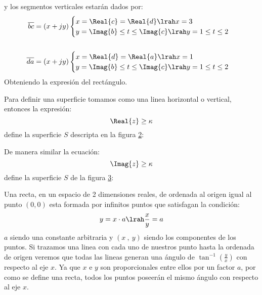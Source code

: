 y los segmentos verticales estarán dados por:
\begin{equation}
\begin{aligned}
    \overline{bc}=(x+jy)&
    \begin{cases}
        x=\Real{c}=\Real{d}\lrah x=3\\
        y=\Imag{b}\leq t\leq \Imag{c}\lrah y=1\leq t\leq2
    \end{cases}\\
    \\
    \overline{da}=(x+jy)&
    \begin{cases}
        x=\Real{d}=\Real{a}\lrah x=1\\
        y=\Imag{b}\leq t\leq \Imag{c}\lrah y=1\leq t\leq2
    \end{cases}
\end{aligned}
\end{equation}
Obteniendo la expresión del rectángulo.
\begin{figure}[H]
    \centering
    
    \label{fig:RectF}
\end{figure}
Para definir una superficie tomamos como una linea horizontal o vertical, entonces la expresión:
\begin{equation}
    \Real{z} \geq \kappa
\end{equation}
define la superficie $S$ descripta en la figura \ref{fig:SupVF}:
\begin{figure}[H]
    \centering
    
    \label{fig:SupVF}
\end{figure}
De manera similar la ecuación:
\begin{equation}
    \Imag{z} \geq \kappa
\end{equation}
define la superficie $S$ de la figura \ref{fig:SupHF}:
\begin{figure}[H]
    \centering
    
    \label{fig:SupHF}
\end{figure}
Una recta, en un espacio de 2 dimensiones reales, de ordenada al origen igual al punto $(0,0)$ esta formada por infinitos puntos que satisfagan la condición:
\begin{equation}
   y=x\cdot a \lrah \frac{x}{y}=a
\end{equation}
$a$ siendo una constante arbitraria y $(x\ ,\ y)$ siendo los componentes de los puntos. Si trazamos una linea con cada uno de nuestros punto hasta la ordenada de origen veremos que todas las lineas generan una ángulo de $\tan^{-1}{(\frac{y}{x})}$ con respecto al eje $x$. Ya que $x$ e $y$ son proporcionales entre ellos por un factor $a$, por como se define una recta, todos los puntos poseerán el mismo ángulo con respecto al eje $x$.

